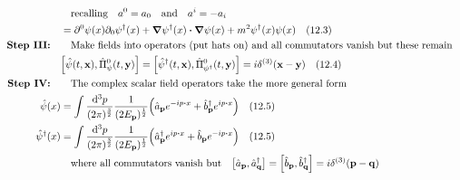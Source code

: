 \documentclass{article}
\begin{document}
\begin{align*}
                             & \qq{recalling}a^0=a_0\qand a^i=-a_i                                                                                                                                                            \\
                             & =\partial^0\psi(x)\partial_0\psi^\dagger(x)+\grad\psi^\dagger(x)\vdot\grad\psi(x)+m^2\psi^\dagger(x)\psi(x)\qq{(12.3)}                                                                         \\
    \qq*{\textbf{Step III:}} & \qq{Make fields into operators (put hats on) and all commutators vanish but these remain}                                                                                                      \\
                             & \bqty{\hat{\psi}(t,\vb{x}),\hat{\Pi}^0_\psi(t,\vb{y})}  = \bqty{\hat{\psi}^\dagger(t,\vb{x}),\hat{\Pi}^0_{\psi^\dagger}(t,\vb{y})}=i\delta^{(3)}(\vb{x}-\vb{y})\qq{(12.4)}                     \\
    \qq*{\textbf{Step IV:}}  & \qq{The complex scalar field operators take the more general form}                                                                                                                             \\
    \hat{\psi}(x)            & =\int \frac{\dd[3]{p}}{(2\pi)^\frac{3}{2}}  \frac{1}{(2E_{\vb{p}})^{\frac{1}{2}}}  \pqty{\hat{a}_{\vb{p}}e^{-ip\vdot x}+\hat{b}^\dagger_{\vb{p}}e^{ip\vdot x}} \qq{(12.5)}                     \\
    \hat{\psi}^\dagger (x)   & =\int \frac{\dd[3]{p}}{(2\pi)^\frac{3}{2}}  \frac{1}{(2E_{\vb{p}})^{\frac{1}{2}}}  \pqty{\hat{a}^\dagger_{\vb{p}}e^{ip\vdot x}+\hat{b}_{\vb{p}}e^{-ip\vdot x}} \qq{(12.5)}                     \\
                             & \qq{where all commutators vanish but}\bqty{\hat{a}_{\vb{p}},\hat{a}_{\vb{q}}^\dagger}=\bqty{\hat{b}_{\vb{p}},\hat{b}_{\vb{q}}^\dagger}=i\delta^{(3)}(\vb{p}-\vb{q})                            \\
\end{align*}
\end{document}
